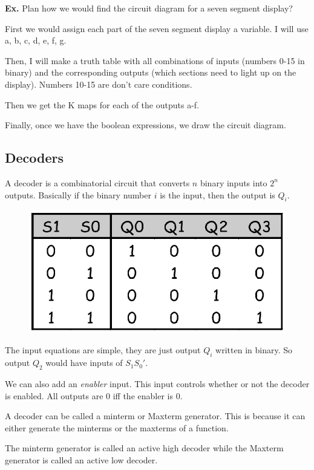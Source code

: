 \documentclass[12pt,letterpaper]{article} \usepackage{amsmath} \usepackage{graphicx}  \usepackage{longtable}  \usepackage{amssymb}
\begin{document}
    \begin{mdframed}
        \textbf{Ex. } Plan how we would find the circuit diagram for a seven segment display?

        First we would assign each part of the seven segment display a variable. I will use a, b, c, d, e, f, g.

        Then, I will make a truth table with all combinations of inputs (numbers 0-15 in binary) and the corresponding outputs (which sections need to light up on the display). Numbers 10-15 are don't care conditions. 

        Then we get the K maps for each of the outputs a-f.

        Finally, once we have the boolean expressions, we draw the circuit diagram.
    \end{mdframed}
        
        \subsection{Decoders}
        A decoder is a combinatorial circuit that converts $n$ binary inputs into $2^n$ outputs. Basically if the binary number $i$ is the input, then the output is $Q_i$. 
        \begin{figure}[H]
            \centering
            \includegraphics[width=0.3\linewidth]{dec1.png}
        \end{figure}
        
        The input equations are simple, they are just output $Q_i$ written in binary. So output $Q_2$ would have inputs of $S_1S_0'$.

        We can also add an \emph{enabler} input. This input controls whether or not the decoder is enabled. All outputs are 0 iff the enabler is 0. 

        A decoder can be called a minterm or Maxterm generator. This is because it can either generate the minterms or the maxterms of a function. 
        
        The minterm generator is called an active high decoder while the Maxterm generator is called an active low decoder.
\end{document}
